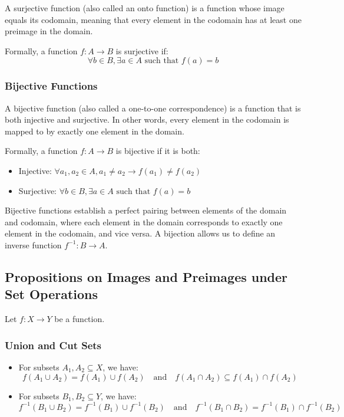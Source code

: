 A surjective function (also called an onto function) is a function whose image equals its codomain, meaning that every element in the codomain has at least one preimage in the domain.

Formally, a function \(f: A \to B\) is surjective if:
\[
	\forall b \in B, \exists a \in A \text{ such that } f(a) = b
\]

\subsubsection*{Bijective Functions}

A bijective function (also called a one-to-one correspondence) is a function that is both injective and surjective. In other words, every element in the codomain is mapped to by exactly one element in the domain.

Formally, a function \(f: A \to B\) is bijective if it is both:
\begin{itemize}[label=\(-\)]
	\item Injective: \(\forall a_1, a_2 \in A, a_1 \neq a_2 \to f(a_1) \neq f(a_2)\)
	\item Surjective: \(\forall b \in B, \exists a \in A \text{ such that } f(a) = b\)
\end{itemize}
 Bijective functions establish a perfect pairing between elements of the domain and codomain, where each element in the domain corresponds to exactly one element in the codomain, and vice versa. A bijection allows us to define an inverse function \(f^{-1}: B \to A\).

\subsection{Propositions on Images and Preimages under Set Operations}

Let \( f : X \to Y \) be a function.

\subsubsection{Union and Cut Sets}

\begin{itemize}[label=\(-\)]
	\item For subsets \( A_1, A_2 \subseteq X \), we have:
	      \[
		      f(A_1 \cup A_2) = f(A_1) \cup f(A_2)
		      \quad \text{and} \quad
		      f(A_1 \cap A_2) \subseteq f(A_1) \cap f(A_2)
	      \]

	\item For subsets \( B_1, B_2 \subseteq Y \), we have:
	      \[
		      f^{-1}(B_1 \cup B_2) = f^{-1}(B_1) \cup f^{-1}(B_2)
		      \quad \text{and} \quad
		      f^{-1}(B_1 \cap B_2) = f^{-1}(B_1) \cap f^{-1}(B_2)
	      \]
\end{itemize}

